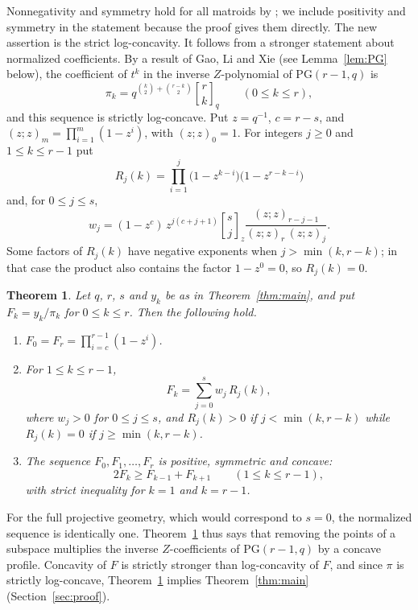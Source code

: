 \documentclass{amsart}
\newtheorem{theorem}{Theorem}[section]
\theoremstyle{remark}
\numberwithin{equation}{section}
\newcommand{\qbinom}[3]{\genfrac{[}{]}{0pt}{}{#1}{#2}_{#3}}
\newcommand{\PG}{\mathrm{PG}}
\newcommand{\poch}[1]{(z;z)_{#1}}
\begin{document}
Nonnegativity and symmetry hold for all matroids by \cite[Proposition~2.1 and Lemma~2.2]{GRX}; we include positivity and symmetry in the statement because the proof gives them directly. The new assertion is the strict log-concavity. It follows from a stronger statement about normalized coefficients. By a result of Gao, Li and Xie \cite[Proposition~3.8]{GLX} (see Lemma~\ref{lem:PG} below), the coefficient of $t^k$ in the inverse $Z$-polynomial of $\PG(r-1,q)$ is
\begin{equation}\label{eq:pi}
  \pi_k=q^{\binom{k}{2}+\binom{r-k}{2}}\qbinom{r}{k}{q}\qquad(0\le k\le r),
\end{equation}
and this sequence is strictly log-concave. Put $z=q^{-1}$, $c=r-s$, and $\poch{m}=\prod_{i=1}^{m}(1-z^i)$, with $\poch{0}=1$. For integers $j\ge0$ and $1\le k\le r-1$ put
\begin{equation}\label{eq:Rw}
  R_j(k)=\prod_{i=1}^{j}\bigl(1-z^{k-i}\bigr)\bigl(1-z^{r-k-i}\bigr)
\end{equation}
and, for $0\le j\le s$,
\begin{equation}\label{eq:w}
  w_j=(1-z^c)\,z^{j(c+j+1)}\qbinom{s}{j}{z}\frac{\poch{r-j-1}}{\poch{r}\,\poch{j}}.
\end{equation}
Some factors of $R_j(k)$ have negative exponents when $j>\min(k,r-k)$; in that case the product also contains the factor $1-z^0=0$, so $R_j(k)=0$.

\begin{theorem}\label{thm:F}
Let $q$, $r$, $s$ and $y_k$ be as in Theorem~\ref{thm:main}, and put $F_k=y_k/\pi_k$ for $0\le k\le r$. Then the following hold.
\begin{enumerate}
\item[(i)] $F_0=F_r=\prod_{i=c}^{r-1}(1-z^i)$.
\item[(ii)] For $1\le k\le r-1$,
\[
  F_k=\sum_{j=0}^{s}w_j\,R_j(k),
\]
where $w_j>0$ for $0\le j\le s$, and $R_j(k)>0$ if $j<\min(k,r-k)$ while $R_j(k)=0$ if $j\ge\min(k,r-k)$.
\item[(iii)] The sequence $F_0,F_1,\dots,F_r$ is positive, symmetric and concave:
\[
  2F_k\ge F_{k-1}+F_{k+1}\qquad(1\le k\le r-1),
\]
with strict inequality for $k=1$ and $k=r-1$.
\end{enumerate}
\end{theorem}

For the full projective geometry, which would correspond to $s=0$, the normalized sequence is identically one. Theorem~\ref{thm:F} thus says that removing the points of a subspace multiplies the inverse $Z$-coefficients of $\PG(r-1,q)$ by a concave profile. Concavity of $F$ is strictly stronger than log-concavity of $F$, and since $\pi$ is strictly log-concave, Theorem~\ref{thm:F} implies Theorem~\ref{thm:main} (Section~\ref{sec:proof}).
\end{document}
